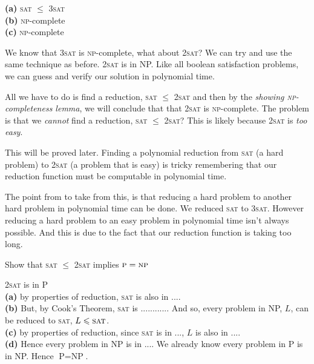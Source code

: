 {
\textbf{(a)} \textsc{sat} $\leqslant$ \textsc{3sat} \\
\textbf{(b)} \textsc{np}-complete \\
\textbf{(c)} \textsc{np}-complete 
}

\frmrule

We know that \textsc{3sat} is \textsc{np}-complete, 
what about \textsc{2sat}? We can try and use the same technique as 
before. \textsc{2sat} is in NP. Like all boolean satisfaction problems, 
we can guess and verify our solution in polynomial time. 

All we have to do is find a reduction, \textsc{sat} $\leqslant$ \textsc{2sat}
and then by the \textit{showing \textsc{np}-completeness lemma},  
we will conclude that that \textsc{2sat}  is \textsc{np}-complete. 
The problem is that we \textit{cannot} find a reduction, 
\textsc{sat} $\leqslant$ \textsc{2sat}?
This is likely because \textsc{2sat} is \textit{too easy}. 


This will be proved later.
Finding a polynomial reduction from \textsc{sat} (a hard problem) 
to \textsc{2sat} (a problem that is easy)
is tricky remembering that our reduction function must be computable 
in polynomial time. 

The point from to take from this, is that reducing a hard problem 
to another hard problem in polynomial time can be done. 
We reduced \textsc{sat} to \textsc{3sat}. However reducing 
a hard problem to an easy problem in polynomial time isn't always 
possible. And this is due to the fact that our reduction function is 
taking too long. 

\frmrule

\begin{example}
Show that \textsc{sat} $\leqslant$ \textsc{2sat} implies $\textsc{p} = \textsc{np}$

\textsc{2sat} is in P \\
\textbf{(a)} by properties of reduction, \textsc{sat} is also in .... \\
\textbf{(b)} But, by Cook's Theorem, \textsc{sat} is ............ 
And so, every problem in NP, $L$, can be reduced to 
\textsc{sat}, $L \leqslant \textsc{sat}$. \\
\textbf{(c)} by properties of reduction, 
since \textsc{sat} is in ..., $L$ is also in .... \\
\textbf{(d)} Hence every problem in NP is in ....
We already know every problem in P is in NP. Hence $\text{P} = \text{NP}$.
\end{example}


